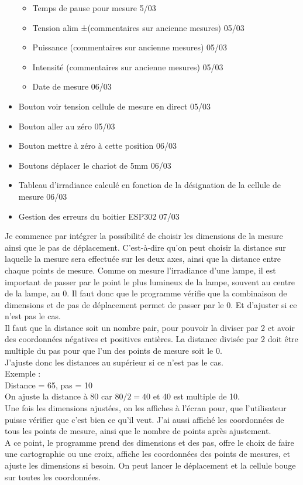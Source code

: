 \documentclass[12pt]{article}
\begin{document}
\begin{itemize}
\begin{itemize}
	\item  Temps de pause pour mesure  5/03
	\item  Tension alim ±(commentaires sur ancienne mesures)  05/03
	\item  Puissance (commentaires sur ancienne mesures)  05/03
	\item  Intensité (commentaires sur ancienne mesures)  05/03
	\item  Date de mesure  06/03
		\end{itemize}
	\item  Bouton voir tension cellule de mesure en direct  05/03
	\item  Bouton aller au zéro  05/03
	\item  Bouton mettre à zéro à cette position  06/03
	\item  Boutons déplacer le chariot de 5mm  06/03
	\item  Tableau d'irradiance calculé en fonction de la désignation de la cellule de mesure  06/03
	\item  Gestion des erreurs du boitier ESP302 07/03
\end{itemize}


Je commence par intégrer la possibilité de choisir les dimensions de la mesure ainsi que le pas de déplacement.
C'est-à-dire qu'on peut choisir la distance sur laquelle la mesure sera effectuée sur les deux axes, ainsi que la distance entre chaque points de mesure.
Comme on mesure l'irradiance d'une lampe, il est important de passer par le point le plus lumineux de la lampe, souvent au centre de la lampe, au 0.
Il faut donc que le programme vérifie que la combinaison de dimensions et de pas de déplacement permet de passer par le 0.
Et d'ajuster si ce n'est pas le cas.\\
Il faut que la distance soit un nombre pair, pour pouvoir la diviser par 2 et avoir des coordonnées négatives et positives entières. La distance divisée par 2 doit être multiple du pas pour que l'un des points de mesure soit le 0.\\
J'ajuste donc les distances au supérieur si ce n'est pas le cas.
\\Exemple :\\
Distance = 65, pas = 10\\
On ajuste la distance à 80 car $80/2 = 40$ et 40 est multiple de 10.\\
Une fois les dimensions ajustées, on les affiches à l'écran pour, que l'utilisateur puisse vérifier que c'est bien ce qu'il veut.
J'ai aussi affiché les coordonnées de tous les points de mesure, ainsi que le nombre de points après ajustement.\\
A ce point, le programme prend des dimensions et des pas, offre le choix de faire une cartographie ou une croix, affiche les coordonnées des points de mesures, et ajuste les dimensions si besoin.
On peut lancer le déplacement et la cellule bouge sur toutes les coordonnées.
\end{document}

